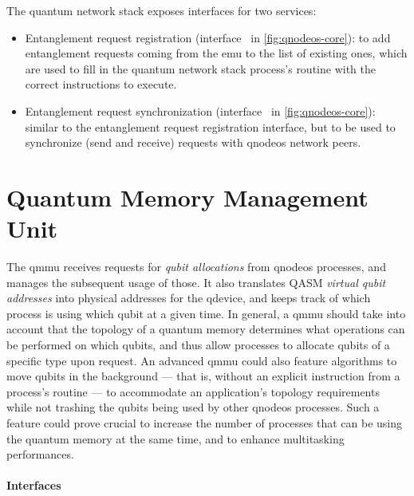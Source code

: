 The quantum network stack exposes interfaces for two services:
\begin{itemize}
    \item Entanglement request registration (interface~ in \cref{fig:qnodeos-core}): to
          add entanglement requests coming from the \acrshort{emu} to the list of existing ones,
          which are used to fill in the quantum network stack process's routine with the correct
          instructions to execute.
    \item Entanglement request synchronization (interface~ in \cref{fig:qnodeos-core}):
          similar to the entanglement request registration interface, but to be used to synchronize
          (send and receive) requests with \acrshort{qnodeos} network peers.
\end{itemize}

\section{Quantum Memory Management Unit}

The \acrfull{qmmu} receives requests for \emph{qubit allocations} from \acrshort{qnodeos} processes,
and manages the subsequent usage of those. It also translates QASM \emph{virtual qubit addresses}
into physical addresses for the \acrshort{qdevice}, and keeps track of which process is using which
qubit at a given time. In general, a \acrshort{qmmu} should take into account that the topology of a
quantum memory determines what operations can be performed on which qubits, and thus allow processes
to allocate qubits of a specific type upon request. An advanced \acrshort{qmmu} could also feature
algorithms to move qubits in the background --- that is, without an explicit instruction from a
process's routine --- to accommodate an application's topology requirements while not trashing the
qubits being used by other \acrshort{qnodeos} processes. Such a feature could prove crucial to
increase the number of processes that can be using the quantum memory at the same time, and to
enhance multitasking performances.

\paragraph{Interfaces}

